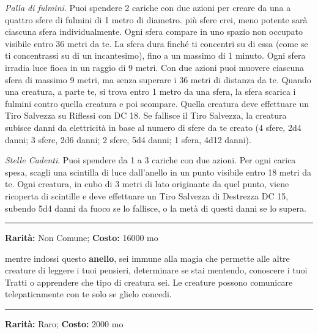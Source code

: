 \begin{multicols}{2}
\emph{Palla di fulmini}. Puoi spendere 2 cariche con due azioni per creare da una a quattro sfere di fulmini di 1 metro di diametro. più sfere crei, meno potente sarà ciascuna sfera individualmente.
Ogni sfera compare in uno spazio non occupato visibile entro 36 metri da te. La sfera dura finché ti concentri su di essa (come se ti concentrassi su di un incantesimo), fino a un massimo di 1 minuto. Ogni sfera irradia luce fioca in un raggio di 9 metri. Con due azioni puoi muovere ciascuna sfera di massimo 9 metri, ma senza superare i 36 metri di distanza da te. Quando una creatura, a parte te, si trova entro 1 metro da una sfera, la sfera scarica i fulmini contro quella creatura e poi scompare. Quella creatura deve effettuare un Tiro Salvezza su Riflessi con DC 18. Se fallisce il Tiro Salvezza, la creatura subisce danni da elettricità in base al numero di sfere da te creato (4 sfere, 2d4 danni; 3 sfere, 2d6 danni; 2 sfere, 5d4 danni; 1 sfera, 4d12 danni).

\emph{Stelle Cadenti}. Puoi spendere da 1 a 3 cariche con due azioni. Per ogni carica spesa, scagli una scintilla di luce dall'anello in un punto visibile entro 18 metri da te. Ogni creatura, in cubo di 3 metri di lato originante da quel punto, viene ricoperta di scintille e deve effettuare un Tiro Salvezza di Destrezza DC 15, subendo 5d4 danni da fuoco se lo fallisce, o la metà di questi danni se lo supera.

\smallskip\noindent\rule{\linewidth}{2pt}  \hypertarget{AnellodelloScudoMentale}{}\medskip{}\noindent\label{AnellodelloScudoMentale}

\textbf{Rarità:} Non Comune; \textbf{Costo:} 16000 mo

mentre indossi questo \textbf{anello}, sei immune alla magia che permette alle altre creature di leggere i tuoi pensieri, determinare se stai mentendo, conoscere i tuoi Tratti o apprendere che tipo di creatura sei. Le creature possono comunicare telepaticamente con te solo se glielo concedi.

\smallskip\noindent\rule{\linewidth}{2pt}  \hypertarget{AnellodiCadutaPiuma}{}\medskip{}\noindent\label{AnellodiCadutaPiuma}

\textbf{Rarità:} Raro; \textbf{Costo:} 2000 mo


\end{multicols}
